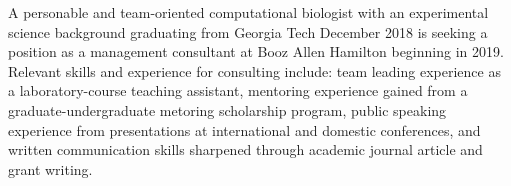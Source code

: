 

\begin{cventries}


\fontsize{10pt}{1em}\bodyfontlight\upshape\color{black}\justify
A personable and team-oriented computational biologist with an experimental science background graduating from Georgia Tech December 2018 is seeking a position as a management consultant at Booz Allen Hamilton beginning in 2019. Relevant skills and experience for consulting include: team leading experience as a laboratory-course teaching assistant, mentoring experience gained from a graduate-undergraduate metoring scholarship program, public speaking experience from presentations at international and domestic conferences, and written communication skills sharpened through academic journal article and grant writing.
    
\vspace{-2.0mm}
\end{cventries}
